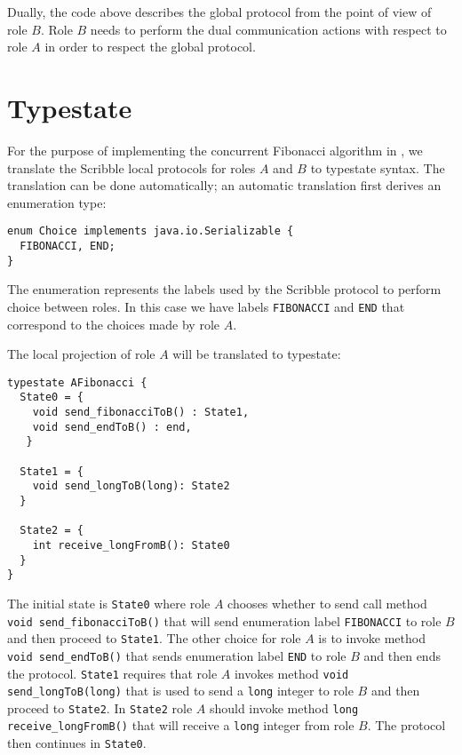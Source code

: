 Dually, the code above describes the global protocol from
the point of view of role $B$. Role $B$ needs to perform
the dual communication actions with respect to role $A$
in order to respect the global protocol.


\section{Typestate}

For the purpose of implementing the concurrent Fibonacci
algorithm in \Mungo,
we translate the Scribble local protocols for roles
$A$ and $B$ to \Mungo typestate syntax.
The translation can be done automatically;
an automatic translation first derives an
enumeration type:

\begin{lstlisting}[caption={Enumeration for the communication choice}]
enum Choice implements java.io.Serializable {
  FIBONACCI, END;
}
\end{lstlisting}

The enumeration represents the
labels used by the Scribble protocol
to perform choice between roles. In this
case we have labels \lstinline|FIBONACCI| and
\lstinline|END| that correspond to the choices
made by role $A$.

The local projection of role $A$ will be translated to typestate:

\begin{lstlisting}[caption={Typestate for Role A}]
typestate AFibonacci {
  State0 = {
    void send_fibonacciToB() : State1,
    void send_endToB() : end,
   }

  State1 = {
    void send_longToB(long): State2
  }

  State2 = {
    int receive_longFromB(): State0
  }
}
\end{lstlisting}

The initial state is \lstinline|State0| where
role $A$ chooses whether to send call method
\lstinline|void send_fibonacciToB()| that
will send enumeration label \lstinline|FIBONACCI| to role $B$
and then proceed to \lstinline|State1|. The other
choice for role $A$ is to invoke method
\lstinline|void send_endToB()| that sends
enumeration label \lstinline|END| to role $B$
and then ends the protocol.
\lstinline|State1| requires that role $A$ invokes
method \lstinline|void send_longToB(long)| that
is used to send a \lstinline|long| integer to role
$B$ and then proceed to \lstinline|State2|. In 
\lstinline|State2| role $A$ should invoke method
\lstinline|long receive_longFromB()| that will
receive a \lstinline|long| integer from role $B$.
The protocol then continues in \lstinline|State0|.


